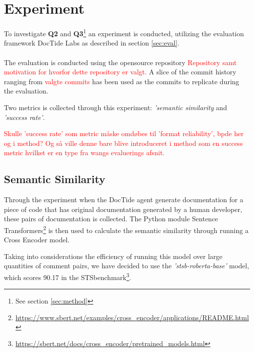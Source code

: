 \section{Experiment}
\label{sec:exp}
To investigate \textbf{Q2} and \textbf{Q3}\footnote{See section \ref{sec:method}} an experiment is conducted, utilizing the evaluation framework DocTide Labs as described in section \ref{sec:eval}. 
\\ \\
The evaluation is conducted using the opensource repository \textcolor{red}{Repository samt motivation for hvorfor dette repository er valgt.} A slice of the commit history ranging from \textcolor{red}{valgte commits} has been used as the commits to replicate during the evaluation.

Two metrics is collected through this experiment: \textit{'semantic similarity} and \textit{'success rate'}.

\textcolor{red}{Skulle 'success rate' som metric måske omdøbes til 'format reliability', bpde her og i method? Og så ville denne bare blive introduceret i method som en success metric hvilket er en type fra wangs evaluerings afsnit.}

\subsection{Semantic Similarity}
Through the experiment when the DocTide agent generate documentation for a piece of code that has original documentation generated by a human developer, these pairs of documentation is collected. The Python module Sentence Transformers\footnote{\url{https://www.sbert.net/examples/cross_encoder/applications/README.html}} is then used to calculate the semantic similarity through running a Cross Encoder model.

Taking into considerations the efficiency of running this model over large quantities of comment pairs, we have decided to use the \textit{'stsb-roberta-base'} model, which scores 90.17 in the STSbenchmark\footnote{\url{https://sbert.net/docs/cross_encoder/pretrained_models.html}}.
